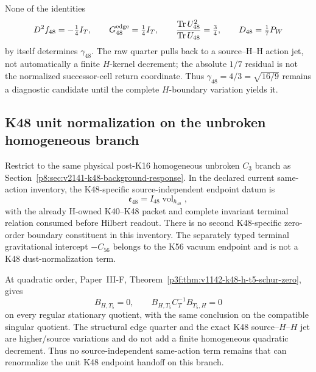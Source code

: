 \documentclass[12pt,a4paper]{article}
\begin{document}
\begin{remark}
\label{p8:rem:v2141-k48-false-shortcuts}
None of the identities
\[
 D^2f_{48}=-\tfrac14I_T,
 \qquad G_{48}^{\rm edge}=\tfrac14I_T,
 \qquad \frac{\operatorname{Tr}U_{48}^2}{\operatorname{Tr}U_{48}}=\tfrac34,
 \qquad D_{48}=\tfrac17P_W
\]
by itself determines $\gamma_{48}$.  The raw quarter pulls back to a
source--H--H action jet, not automatically a finite $H$-kernel decrement; the
absolute $1/7$ residual is not the normalized successor-cell return coordinate.
Thus $\gamma_{48}=4/3=\sqrt{16/9}$ remains a diagnostic candidate until the
complete $H$-boundary variation yields it.
\end{remark}

\subsection{K48 unit normalization on the unbroken homogeneous branch}
\label{p8:sec:v2142-k48-unit-normalization}

\begin{theorem}
\label{p8:thm:v2142-k48-zero-order-schur-exhaustion}
Restrict to the same physical post-K16 homogeneous unbroken $C_3$ branch as
Section~\ref{p8:sec:v2141-k48-background-response}.  In the declared current
same-action inventory, the K48-specific source-independent endpoint datum is
\[
 \mathfrak e_{48}=I_{48}\operatorname{vol}_{h_{48}},
\]
with the already H-owned K40--K48 packet and complete invariant terminal
relation consumed before Hilbert readout.  There is no second K48-specific
zero-order boundary constituent in this inventory.  The separately typed
terminal gravitational intercept $-C_{56}$ belongs to the K56 vacuum endpoint
and is not a K48 dust-normalization term.

At quadratic order, Paper~III-F,
Theorem~\ref{p3f:thm:v1142-k48-h-t5-schur-zero}, gives
\[
 \boxed{B_{H,T_5}=0,
 \qquad B_{H,T_5}C_T^{-1}B_{T_5,H}=0}
\]
on every regular stationary quotient, with the same conclusion on the
compatible singular quotient.  The structural edge quarter and the exact
K48 source--$H$--$H$ jet are higher/source variations and do not add a finite
homogeneous quadratic decrement.  Thus no source-independent same-action term
remains that can renormalize the unit K48 endpoint handoff on this branch.
\end{theorem}
\end{document}
